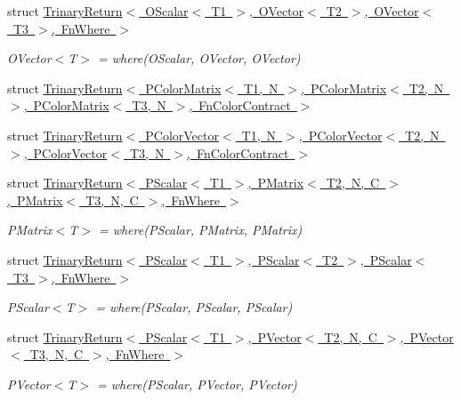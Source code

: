 \begin{DoxyCompactItemize}
struct \mbox{\hyperlink{structENSEM_1_1TrinaryReturn_3_01OScalar_3_01T1_01_4_00_01OVector_3_01T2_01_4_00_01OVector_3_01T3_01_4_00_01FnWhere_01_4}{Trinary\+Return$<$ O\+Scalar$<$ T1 $>$, O\+Vector$<$ T2 $>$, O\+Vector$<$ T3 $>$, Fn\+Where $>$}}
\begin{DoxyCompactList}\small\item\em O\+Vector$<$\+T$>$ = where(\+O\+Scalar, O\+Vector, O\+Vector) \end{DoxyCompactList}\item 
struct \mbox{\hyperlink{structENSEM_1_1TrinaryReturn_3_01PColorMatrix_3_01T1_00_01N_01_4_00_01PColorMatrix_3_01T2_00_01N1d3d49ae4a9604208f2204d046c31000}{Trinary\+Return$<$ P\+Color\+Matrix$<$ T1, N $>$, P\+Color\+Matrix$<$ T2, N $>$, P\+Color\+Matrix$<$ T3, N $>$, Fn\+Color\+Contract $>$}}
\item 
struct \mbox{\hyperlink{structENSEM_1_1TrinaryReturn_3_01PColorVector_3_01T1_00_01N_01_4_00_01PColorVector_3_01T2_00_01N4ce572db3e48fe7214a7d25b458894fc}{Trinary\+Return$<$ P\+Color\+Vector$<$ T1, N $>$, P\+Color\+Vector$<$ T2, N $>$, P\+Color\+Vector$<$ T3, N $>$, Fn\+Color\+Contract $>$}}
\item 
struct \mbox{\hyperlink{structENSEM_1_1TrinaryReturn_3_01PScalar_3_01T1_01_4_00_01PMatrix_3_01T2_00_01N_00_01C_01_4_00_0f44c172914945b9c1c722e99398bb914}{Trinary\+Return$<$ P\+Scalar$<$ T1 $>$, P\+Matrix$<$ T2, N, C $>$, P\+Matrix$<$ T3, N, C $>$, Fn\+Where $>$}}
\begin{DoxyCompactList}\small\item\em P\+Matrix$<$\+T$>$ = where(\+P\+Scalar, P\+Matrix, P\+Matrix) \end{DoxyCompactList}\item 
struct \mbox{\hyperlink{structENSEM_1_1TrinaryReturn_3_01PScalar_3_01T1_01_4_00_01PScalar_3_01T2_01_4_00_01PScalar_3_01T3_01_4_00_01FnWhere_01_4}{Trinary\+Return$<$ P\+Scalar$<$ T1 $>$, P\+Scalar$<$ T2 $>$, P\+Scalar$<$ T3 $>$, Fn\+Where $>$}}
\begin{DoxyCompactList}\small\item\em P\+Scalar$<$\+T$>$ = where(\+P\+Scalar, P\+Scalar, P\+Scalar) \end{DoxyCompactList}\item 
struct \mbox{\hyperlink{structENSEM_1_1TrinaryReturn_3_01PScalar_3_01T1_01_4_00_01PVector_3_01T2_00_01N_00_01C_01_4_00_0742a5a6fd91ed4d5b98fa11837210028}{Trinary\+Return$<$ P\+Scalar$<$ T1 $>$, P\+Vector$<$ T2, N, C $>$, P\+Vector$<$ T3, N, C $>$, Fn\+Where $>$}}
\begin{DoxyCompactList}\small\item\em P\+Vector$<$\+T$>$ = where(\+P\+Scalar, P\+Vector, P\+Vector) \end{DoxyCompactList}\item 

\end{DoxyCompactItemize}
